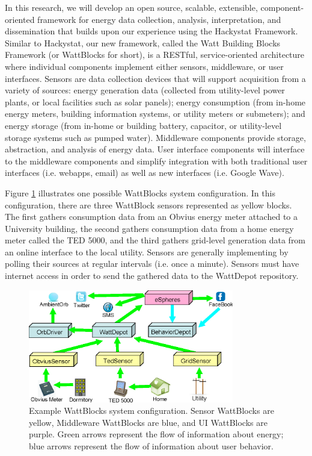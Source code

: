 In this research, we will develop an open source, scalable, extensible,
component-oriented framework for energy data collection, analysis,
interpretation, and dissemination that builds upon our experience using the
Hackystat Framework.  Similar to Hackystat, our new framework, called the
Watt Building Blocks Framework (or WattBlocks for short), is a RESTful,
service-oriented architecture where individual components implement either
sensors, middleware, or user interfaces.  Sensors are data collection
devices that will support acquisition from a variety of sources: energy
generation data (collected from utility-level power plants, or local
facilities such as solar panels); energy consumption (from in-home energy
meters, building information systems, or utility meters or submeters); and
energy storage (from in-home or building battery, capacitor, or
utility-level storage systems such as pumped water).  Middleware components
provide storage, abstraction, and analysis of energy data. User interface
components will interface to the middleware components and simplify
integration with both traditional user interfaces (i.e. webapps, email) as
well as new interfaces (i.e. Google Wave).

Figure \ref{fig:WattBlocks} illustrates one possible WattBlocks system
configuration.  In this configuration, there are three WattBlock sensors
represented as yellow blocks.  The first gathers consumption data from an
Obvius energy meter attached to a University building, the second gathers
consumption data from a home energy meter called the TED 5000, and the
third gathers grid-level generation data from an online interface to the
local utility.  Sensors are generally implementing by polling their sources
at regular intervals (i.e. once a minute). Sensors must have internet
access in order to send the gathered data to the WattDepot repository.


\begin{figure}[th]
  \center
  \includegraphics[width=0.8\textwidth]{architecture.4.eps}
  \caption{\small Example WattBlocks system configuration. Sensor WattBlocks are
    yellow, Middleware WattBlocks are blue, and UI WattBlocks are purple.
    Green arrows represent the flow of information about energy; blue
    arrows represent the flow of information about user behavior.}
  \label{fig:WattBlocks}
\end{figure} 

